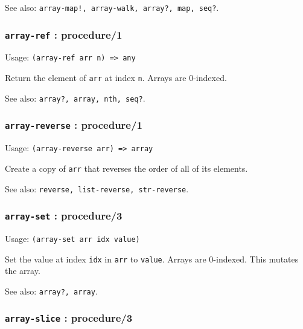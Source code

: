 \documentclass[
]{article}
\newcommand{\passthrough}[1]{#1}
\begin{document}
See also:
\passthrough{\lstinline"array-map!, array-walk, array?, map, seq?"}.

\hypertarget{array-ref-procedure1}{%
\subsubsection{\texorpdfstring{\texttt{array-ref} :
procedure/1}{array-ref : procedure/1}}\label{array-ref-procedure1}}

Usage: \passthrough{\lstinline!(array-ref arr n) => any!}

Return the element of \passthrough{\lstinline!arr!} at index
\passthrough{\lstinline!n!}. Arrays are 0-indexed.

See also: \passthrough{\lstinline!array?, array, nth, seq?!}.

\hypertarget{array-reverse-procedure1}{%
\subsubsection{\texorpdfstring{\texttt{array-reverse} :
procedure/1}{array-reverse : procedure/1}}\label{array-reverse-procedure1}}

Usage: \passthrough{\lstinline!(array-reverse arr) => array!}

Create a copy of \passthrough{\lstinline!arr!} that reverses the order
of all of its elements.

See also: \passthrough{\lstinline!reverse, list-reverse, str-reverse!}.

\hypertarget{array-set-procedure3}{%
\subsubsection{\texorpdfstring{\texttt{array-set} :
procedure/3}{array-set : procedure/3}}\label{array-set-procedure3}}

Usage: \passthrough{\lstinline!(array-set arr idx value)!}

Set the value at index \passthrough{\lstinline!idx!} in
\passthrough{\lstinline!arr!} to \passthrough{\lstinline!value!}. Arrays
are 0-indexed. This mutates the array.

See also: \passthrough{\lstinline!array?, array!}.

\hypertarget{array-slice-procedure3}{%
\subsubsection{\texorpdfstring{\texttt{array-slice} :
procedure/3}{array-slice : procedure/3}}\label{array-slice-procedure3}}
\end{document}
